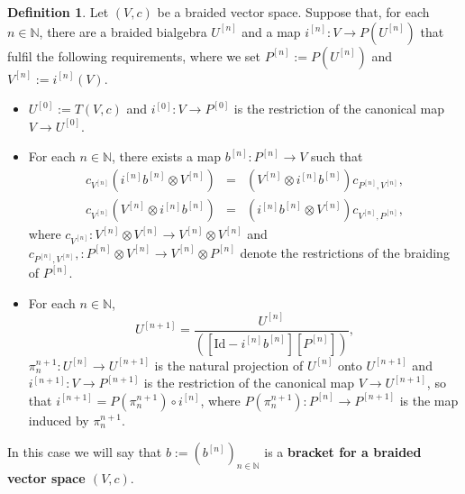 \documentclass[english]{amsart}
\numberwithin{equation}{section}
\numberwithin{figure}{section}
\theoremstyle{plain}
\theoremstyle{definition}
\newtheorem{defn}[thm]{Definition}
\theoremstyle{definition}
\theoremstyle{remark}
\theoremstyle{remark}
\theoremstyle{plain}
\theoremstyle{plain}
\theoremstyle{plain}
\begin{document}
\begin{defn}\label{def:Lie}
\cite[Definitions 5.2 and 5.4]{Ardizzoni-MMPrim} Let $\left(V,c\right)$
be a braided vector space. Suppose that, for each $n\in\mathbb{N}$,
there are a braided bialgebra $U^{[n]}$ and a map $i^{\left[n\right]}:V\rightarrow P\left(U^{\left[n\right]}\right)$
that fulfil the following requirements, where we set $P^{\left[n\right]}:=P\left(U^{\left[n\right]}\right)$
and $V^{\left[n\right]}:=i^{\left[n\right]}\left(V\right)$. 
\begin{itemize}
\item $U^{\left[0\right]}:=T\left(V,c\right)$ and $i^{\left[0\right]}:V\rightarrow P^{[0]}$
is the restriction of the canonical map $V\rightarrow U^{\left[0\right]}$. 
\item For each $n\in\mathbb{N}$, there exists a map $b^{\left[n\right]}:P^{[n]}\rightarrow V$
such that \begin{eqnarray}
c_{V^{\left[n\right]}}\left(i^{\left[n\right]}b^{\left[n\right]}\otimes V^{\left[n\right]}\right) & = & \left(V^{\left[n\right]}\otimes i^{\left[n\right]}b^{\left[n\right]}\right)c_{P^{\left[n\right]},V^{\left[n\right]}},\label{form:bracket1}\\
c_{V^{\left[n\right]}}\left(V^{\left[n\right]}\otimes i^{\left[n\right]}b^{\left[n\right]}\right) & = & \left(i^{\left[n\right]}b^{\left[n\right]}\otimes V^{\left[n\right]}\right)c_{V^{\left[n\right]},P^{\left[n\right]}},\label{form:bracket2}\end{eqnarray}
 where $c_{V^{\left[n\right]}}:V^{[n]}\otimes V^{[n]}\rightarrow V^{[n]}\otimes V^{[n]}$
and $c_{P^{\left[n\right]},V^{\left[n\right]}},:P^{[n]}\otimes V^{[n]}\rightarrow V^{[n]}\otimes P^{[n]}$
denote the restrictions of the braiding of $P^{[n]}$.
\item For each $n\in\mathbb{N}$,\[
U^{\left[n+1\right]}=\frac{U^{\left[n\right]}}{\left(\left[\mathrm{Id}-i^{\left[n\right]}b^{\left[n\right]}\right]\left[P^{\left[n\right]}\right]\right)},\]
 $\pi_n^{n+1}:U^{[n]}\rightarrow U^{[n+1]}$ is the natural projection of $U^{[n]}$ onto $U^{[n+1]}$ and $i^{\left[n+1\right]}:V\rightarrow P^{[n+1]}$ is the restriction
of the canonical map $V\rightarrow U^{\left[n+1\right]}$, so that $i^{[n+1]}=P(\pi_n^{n+1})\circ i^{[n]}$, where $P(\pi_n^{n+1}):P^{[n]}\rightarrow P^{[n+1]}$ is the map induced by $\pi_n^{n+1}$.
\end{itemize}
In this case we will say that $b:=\left(b^{\left[n\right]}\right)_{n\in\mathbb{N}}$\textbf{
}is a \textbf{bracket for a braided vector space $\left(V,c\right)$}.

\end{defn}
\end{document}

